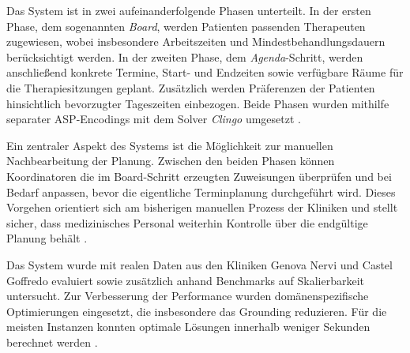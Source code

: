 Das System ist in zwei aufeinanderfolgende Phasen unterteilt. In der ersten Phase, dem sogenannten \textit{Board}, werden Patienten passenden Therapeuten zugewiesen, wobei insbesondere Arbeitszeiten und Mindestbehandlungsdauern berücksichtigt werden. In der zweiten Phase, dem \textit{Agenda}-Schritt, werden anschließend konkrete Termine, Start- und Endzeiten sowie verfügbare Räume für die Therapiesitzungen geplant. Zusätzlich werden Präferenzen der Patienten hinsichtlich bevorzugter Tageszeiten einbezogen. Beide Phasen wurden mithilfe separater ASP-Encodings mit dem Solver \textit{Clingo} umgesetzt \parencite{cardellini2023solvingrehabilitationschedulingproblems}.

Ein zentraler Aspekt des Systems ist die Möglichkeit zur manuellen Nachbearbeitung der Planung. Zwischen den beiden Phasen können Koordinatoren die im Board-Schritt erzeugten Zuweisungen überprüfen und bei Bedarf anpassen, bevor die eigentliche Terminplanung durchgeführt wird. Dieses Vorgehen orientiert sich am bisherigen manuellen Prozess der Kliniken und stellt sicher, dass medizinisches Personal weiterhin Kontrolle über die endgültige Planung behält \parencite{cardellini2023solvingrehabilitationschedulingproblems}.

Das System wurde mit realen Daten aus den Kliniken Genova Nervi und Castel Goffredo evaluiert sowie zusätzlich anhand Benchmarks auf Skalierbarkeit untersucht. Zur Verbesserung der Performance wurden domänenspezifische Optimierungen eingesetzt, die insbesondere das Grounding reduzieren. Für die meisten Instanzen konnten optimale Lösungen innerhalb weniger Sekunden berechnet werden \parencite{cardellini2023solvingrehabilitationschedulingproblems}.



